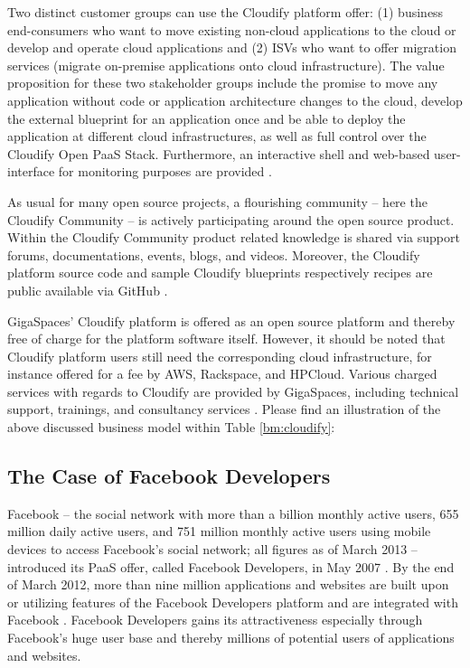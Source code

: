 Two distinct customer groups can use the Cloudify platform offer: (1) business end-consumers who want to move existing non-cloud applications to the cloud or develop and operate cloud applications and (2) \acp{ISV} who want to offer migration services (migrate on-premise applications onto cloud infrastructure). The value proposition for these two stakeholder groups include the promise to move any application without code or application architecture changes to the cloud, develop the external blueprint for an application once and be able to deploy the application at different cloud infrastructures, as well as full control over the Cloudify Open \ac{PaaS} Stack. Furthermore, an interactive shell and web-based user-interface for monitoring purposes are provided \citep{GigaSpaces2013a}.

As usual for many open source projects, a flourishing community -- here the Cloudify Community -- is actively participating around the open source product. Within the Cloudify Community product related knowledge is shared via support forums, documentations, events, blogs, and videos. Moreover, the Cloudify platform source code and sample Cloudify blueprints respectively recipes are public available via GitHub \citep{GigaSpaces2013b,GitHub2013,GitHub2013a}.

GigaSpaces' Cloudify platform is offered as an open source platform and thereby free of charge for the platform software itself. However, it should be noted that Cloudify platform users still need the corresponding cloud infrastructure, for instance offered for a fee by \ac{AWS}, Rackspace, and HPCloud. Various charged services with regards to Cloudify are provided by GigaSpaces, including technical support, trainings, and consultancy services \citep{GigaSpaces2013a}. Please find an illustration of the above discussed business model within Table \ref{bm:cloudify}:



\subsection{The Case of Facebook Developers}\label{ch:sota:fd}

Facebook -- the social network with more than a billion monthly active users, 655 million daily active users, and 751 million monthly active users using mobile devices to access Facebook's social network; all figures as of March 2013 -- introduced its \ac{PaaS} offer, called Facebook Developers, in May 2007 \citep{Facebook2013}. By the end of March 2012, more than nine million applications and websites are built upon or utilizing features of the Facebook Developers platform and are integrated with Facebook \citep{Facebook2013}. Facebook Developers gains its attractiveness especially through Facebook's huge user base and thereby millions of potential users of applications and websites.

